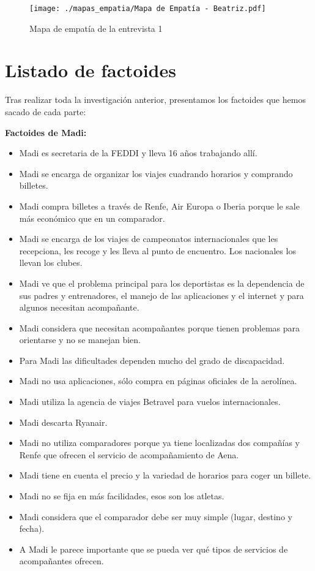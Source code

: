 \begin{figure}[H]
    \centering 
    \texttt{[image: ./mapas\_empatia/Mapa de Empatía - Beatriz.pdf]}
    \caption{Mapa de empatía de la entrevista 1}
    \label{fig:mapa_bea}
\end{figure}

\section{Listado de factoides}

Tras realizar toda la investigación anterior, presentamos los factoides que hemos sacado de cada parte:

\textbf{Factoides de Madi:}

\begin{itemize}
    \item Madi es secretaria de la FEDDI y lleva 16 años trabajando allí.
    \item Madi se encarga de organizar los viajes cuadrando horarios y comprando billetes.
    \item Madi compra billetes a través de Renfe, Air Europa o Iberia porque le sale más económico que en un comparador.
    \item Madi se encarga de los viajes de campeonatos internacionales que les recepciona, les recoge y les lleva al punto de encuentro. Los nacionales los llevan los clubes.
    \item Madi ve que el problema principal para los deportistas es la dependencia de sus padres y entrenadores, el manejo de las aplicaciones y el internet y para algunos necesitan acompañante.
    \item Madi considera que necesitan acompañantes porque tienen problemas para orientarse y no se manejan bien.
    \item Para Madi las dificultades dependen mucho del grado de discapacidad.
    \item Madi no usa aplicaciones, sólo compra en páginas oficiales de la aerolínea.
    \item Madi utiliza la agencia de viajes Betravel para vuelos internacionales.
    \item Madi descarta Ryanair.
    \item Madi no utiliza comparadores porque ya tiene localizadas dos compañías y Renfe que ofrecen el servicio de acompañamiento de Aena.
    \item Madi tiene en cuenta el precio y la variedad de horarios para coger un billete.
    \item Madi no se fija en más facilidades, esos son los atletas.
    \item Madi considera que el comparador debe ser muy simple (lugar, destino y fecha).
    \item A Madi le parece importante que se pueda ver qué tipos de servicios de acompañantes ofrecen.
\end{itemize}


